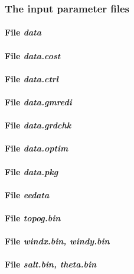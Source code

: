 \subsubsection{The input parameter files}

\paragraph{File {\it data}}

\paragraph{File {\it data.cost}}

\paragraph{File {\it data.ctrl}}

\paragraph{File {\it data.gmredi}}

\paragraph{File {\it data.grdchk}}

\paragraph{File {\it data.optim}}

\paragraph{File {\it data.pkg}}

\paragraph{File {\it eedata}}

\paragraph{File {\it topog.bin}}

\paragraph{File {\it windx.bin, windy.bin}}

\paragraph{File {\it salt.bin, theta.bin}}

